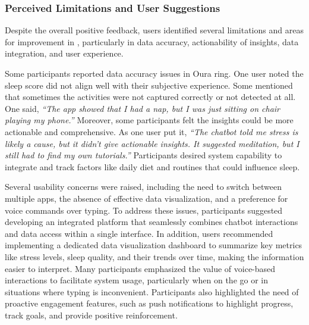 \subsubsection{Perceived Limitations and User Suggestions}
Despite the overall positive feedback, users identified several limitations and areas for improvement in \name{}, particularly in data accuracy, actionability of insights, data integration, and user experience.

Some participants reported data accuracy issues in Oura ring. One user noted the sleep score did not align well with their subjective experience. Some mentioned that sometimes the activities were not captured correctly or not detected at all.
One said, \textit{``The app showed that I had a nap, but I was just sitting on chair playing my phone.''}
Moreover, some participants felt the insights could be more actionable and comprehensive. As one user put it, \textit{``The chatbot told me stress is likely a cause, but it didn't give actionable insights. It suggested meditation, but I still had to find my own tutorials.''}
Participants desired system capability to integrate and track factors like daily diet and routines that could influence sleep. 


Several usability concerns were raised, including the need to switch between multiple apps, the absence of effective data visualization, and a preference for voice commands over typing. To address these issues, participants suggested developing an integrated platform that seamlessly combines chatbot interactions and data access within a single interface.
In addition, users recommended implementing a dedicated data visualization dashboard to summarize key metrics like stress levels, sleep quality, and their trends over time, making the information easier to interpret. Many participants emphasized the value of voice-based interactions to facilitate system usage, particularly when on the go or in situations where typing is inconvenient.
Participants also highlighted the need of proactive engagement features, such as 
push notifications to highlight progress, track goals, and provide positive reinforcement.

